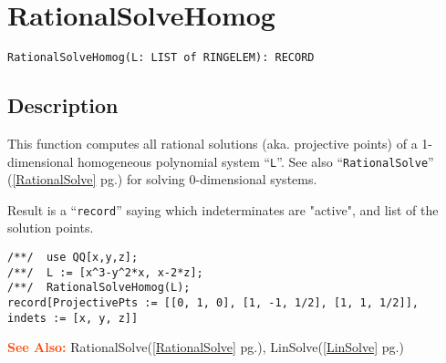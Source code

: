 \documentclass[a4paper]{mybook}
\newenvironment{command}{}{} %
\newcommand\SeeAlso{\par\textcolor{OrangeRed}{\textbf{\large See Also: }}}
\begin{document}
\section{RationalSolveHomog}
\label{RationalSolveHomog}
\begin{command} %


\begin{Verbatim}[label=syntax, rulecolor=\color{MidnightBlue},
frame=single]
RationalSolveHomog(L: LIST of RINGELEM): RECORD
\end{Verbatim}


\subsection*{Description}

This function computes all rational solutions (aka. projective points)
of a 1-dimensional homogeneous polynomial system ``\verb&L&''.  See
also ``\verb&RationalSolve&'' (\ref{RationalSolve} pg.\pageref{RationalSolve}) for solving 0-dimensional systems.
\par 
Result is a ``\verb&record&'' saying which indeterminates are "active",
and list of the solution points.
\begin{Verbatim}[label=example, rulecolor=\color{PineGreen}, frame=single]
/**/  use QQ[x,y,z];
/**/  L := [x^3-y^2*x, x-2*z];
/**/  RationalSolveHomog(L);
record[ProjectivePts := [[0, 1, 0], [1, -1, 1/2], [1, 1, 1/2]],  indets := [x, y, z]]
\end{Verbatim}


\SeeAlso %
  RationalSolve(\ref{RationalSolve} pg.\pageref{RationalSolve}), 
    LinSolve(\ref{LinSolve} pg.\pageref{LinSolve})
\end{command} %
\end{document}
